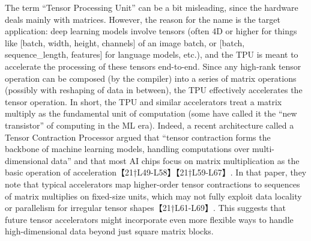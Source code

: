 The term “Tensor Processing Unit” can be a bit misleading, since the hardware deals mainly with matrices. However, the reason for the name is the target application: deep learning models involve tensors (often 4D or higher for things like [batch, width, height, channels] of an image batch, or [batch, sequence\_length, features] for language models, etc.), and the TPU is meant to accelerate the processing of these tensors end-to-end. Since any high-rank tensor operation can be composed (by the compiler) into a series of matrix operations (possibly with reshaping of data in between), the TPU effectively accelerates the tensor operation. In short, the TPU and similar accelerators treat a matrix multiply as the fundamental unit of computation (some have called it the “new transistor” of computing in the ML era). Indeed, a recent architecture called a Tensor Contraction Processor argued that “tensor contraction forms the backbone of machine learning models, handling computations over multi-dimensional data” and that most AI chips focus on matrix multiplication as the basic operation of acceleration【21†L49-L58】【21†L59-L67】. In that paper, they note that typical accelerators map higher-order tensor contractions to sequences of matrix multiplies on fixed-size units, which may not fully exploit data locality or parallelism for irregular tensor shapes【21†L61-L69】. This suggests that future tensor accelerators might incorporate even more flexible ways to handle high-dimensional data beyond just square matrix blocks.

